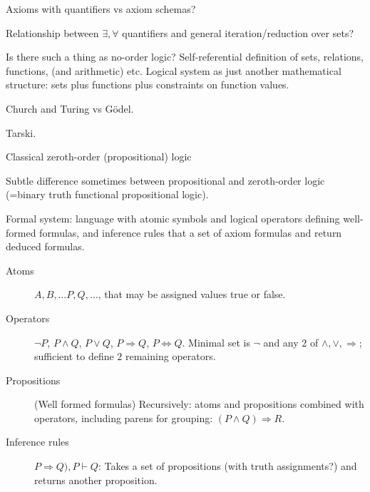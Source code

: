 \setcounter{currentlevel}{\value{baseSectionLevel}}
\label{sec:Logic}

\cite{wiki:Logic}

Axioms with quantifiers vs axiom schemas?

Relationship between $\exists, \forall$ quantifiers
and general iteration/reduction over sets?

Is there such a thing as no-order logic?
Self-referential definition of sets, relations, functions,
(and arithmetic) etc. 
Logical system  as just another mathematical structure:
sets plus functions plus constraints on function values.

Church and Turing vs G\"{o}del.

Tarski.

\label{sec:Formal_languages}

\label{sec:Proof_theory}

\label{sec:Model_theory}

\label{sec:Zeroth_order_logic}

Classical zeroth-order (propositional) 
logic~\cite{iep:Propositional_logic,
wiki:Propositional_calculus,
wiki:Zeroth_order_logic}

Subtle difference sometimes between propositional
and zeroth-order logic 
(=binary truth functional propositional logic).

Formal system:
language with atomic symbols
and logical operators defining well-formed formulas,
and inference rules that a set of axiom formulas 
and return deduced formulas.
\begin{description}
\item[Atoms]  $A, B, \ldots P, Q, \ldots$, 
that may be assigned values \textsf{true} or \textsf{false}.

\item[Operators] $\lnot P$, $P \wedge Q$, $P \vee Q$, 
$P \Rightarrow Q$, $P \Leftrightarrow Q$. 
Minimal set is $\lnot$ and 
any $2$ of  $\wedge, \vee, \Rightarrow$;
sufficient to define $2$ remaining operators.

\item[Propositions] (Well formed formulas)
Recursively: atoms and propositions combined with operators,
including parens for grouping: $(P \wedge Q) \Rightarrow R$.

\item[Inference rules] ${P \Rightarrow Q), P} \vdash Q$:
Takes a set of propositions (with truth assignments?)
and returns another proposition.
\end{description}

